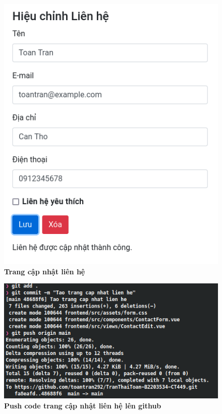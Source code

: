 {}
\setcounter{subsection}{5}
\setcounter{figure}{0}
\begin{figure}[H]
    \centering
    \includegraphics{imgs/7.png}
    \caption{\bfseries Trang cập nhật liên hệ}
\end{figure}
\begin{figure}[H]
    \centering
    \includegraphics{imgs/8.png}
    \caption{\bfseries Push code trang cập nhật liên hệ lên github}
\end{figure}
